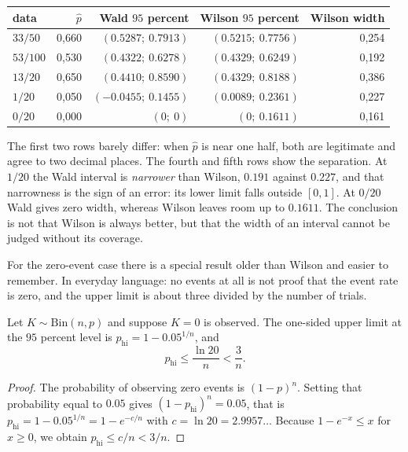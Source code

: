 \begin{center}
\small
\begin{tabular}{lrrrr}
\hline
data & $\hat p$ & Wald $95$ percent & Wilson $95$ percent & Wilson width \\
\hline
$33/50$  & 0,660 & $(0.5287;\ 0.7913)$ & $(0.5215;\ 0.7756)$ & 0,254 \\
$53/100$ & 0,530 & $(0.4322;\ 0.6278)$ & $(0.4329;\ 0.6249)$ & 0,192 \\
$13/20$  & 0,650 & $(0.4410;\ 0.8590)$ & $(0.4329;\ 0.8188)$ & 0,386 \\
$1/20$   & 0,050 & $(-0.0455;\ 0.1455)$ & $(0.0089;\ 0.2361)$ & 0,227 \\
$0/20$   & 0,000 & $(0;\ 0)$ & $(0;\ 0.1611)$ & 0,161 \\
\hline
\end{tabular}
\end{center}

The first two rows barely differ: when $\hat p$ is near one half, both are legitimate and
agree to two decimal places. The fourth and fifth rows show the separation. At $1/20$ the Wald
interval is \emph{narrower} than Wilson, $0.191$ against $0.227$, and that narrowness is
the sign of an error: its lower limit falls outside $[0,1]$. At $0/20$ Wald gives zero width,
whereas Wilson leaves room up to $0.1611$. The conclusion is not that Wilson is always
better, but that the width of an interval cannot be judged without its coverage.

For the zero-event case there is a special result older than Wilson and easier to remember. In
everyday language: no events at all is not proof that the event rate is zero, and the upper
limit is about three divided by the number of trials.


\begin{teorema}
Let $K\sim\mathrm{Bin}(n,p)$ and suppose $K=0$ is observed. The one-sided upper limit at the
$95$ percent level is $p_{\mathrm{hi}}=1-0.05^{1/n}$, and
\[
p_{\mathrm{hi}}\le\frac{\ln 20}{n}<\frac{3}{n}.
\]
\end{teorema}

\begin{proof}[Proof]
The probability of observing zero events is $(1-p)^n$. Setting that probability equal to
$0.05$ gives $(1-p_{\mathrm{hi}})^n=0.05$, that is
$p_{\mathrm{hi}}=1-0.05^{1/n}=1-e^{-c/n}$ with $c=\ln 20=2.9957\ldots$ Because
$1-e^{-x}\le x$ for $x\ge0$, we obtain $p_{\mathrm{hi}}\le c/n<3/n$.
\end{proof}

